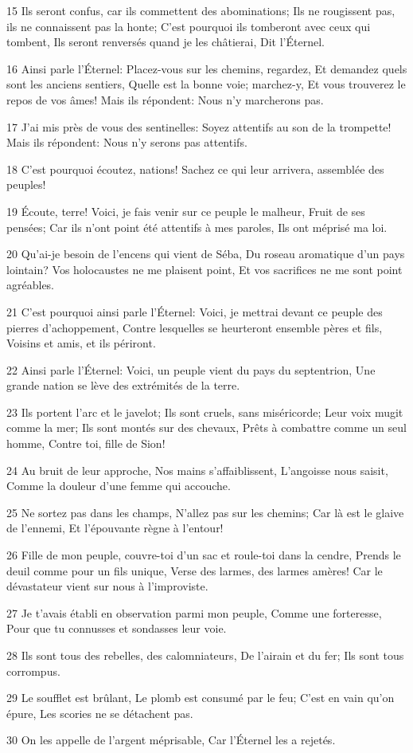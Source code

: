 \par 15 Ils seront confus, car ils commettent des abominations; Ils ne rougissent pas, ils ne connaissent pas la honte; C'est pourquoi ils tomberont avec ceux qui tombent, Ils seront renversés quand je les châtierai, Dit l'Éternel.
\par 16 Ainsi parle l'Éternel: Placez-vous sur les chemins, regardez, Et demandez quels sont les anciens sentiers, Quelle est la bonne voie; marchez-y, Et vous trouverez le repos de vos âmes! Mais ils répondent: Nous n'y marcherons pas.
\par 17 J'ai mis près de vous des sentinelles: Soyez attentifs au son de la trompette! Mais ils répondent: Nous n'y serons pas attentifs.
\par 18 C'est pourquoi écoutez, nations! Sachez ce qui leur arrivera, assemblée des peuples!
\par 19 Écoute, terre! Voici, je fais venir sur ce peuple le malheur, Fruit de ses pensées; Car ils n'ont point été attentifs à mes paroles, Ils ont méprisé ma loi.
\par 20 Qu'ai-je besoin de l'encens qui vient de Séba, Du roseau aromatique d'un pays lointain? Vos holocaustes ne me plaisent point, Et vos sacrifices ne me sont point agréables.
\par 21 C'est pourquoi ainsi parle l'Éternel: Voici, je mettrai devant ce peuple des pierres d'achoppement, Contre lesquelles se heurteront ensemble pères et fils, Voisins et amis, et ils périront.
\par 22 Ainsi parle l'Éternel: Voici, un peuple vient du pays du septentrion, Une grande nation se lève des extrémités de la terre.
\par 23 Ils portent l'arc et le javelot; Ils sont cruels, sans miséricorde; Leur voix mugit comme la mer; Ils sont montés sur des chevaux, Prêts à combattre comme un seul homme, Contre toi, fille de Sion!
\par 24 Au bruit de leur approche, Nos mains s'affaiblissent, L'angoisse nous saisit, Comme la douleur d'une femme qui accouche.
\par 25 Ne sortez pas dans les champs, N'allez pas sur les chemins; Car là est le glaive de l'ennemi, Et l'épouvante règne à l'entour!
\par 26 Fille de mon peuple, couvre-toi d'un sac et roule-toi dans la cendre, Prends le deuil comme pour un fils unique, Verse des larmes, des larmes amères! Car le dévastateur vient sur nous à l'improviste.
\par 27 Je t'avais établi en observation parmi mon peuple, Comme une forteresse, Pour que tu connusses et sondasses leur voie.
\par 28 Ils sont tous des rebelles, des calomniateurs, De l'airain et du fer; Ils sont tous corrompus.
\par 29 Le soufflet est brûlant, Le plomb est consumé par le feu; C'est en vain qu'on épure, Les scories ne se détachent pas.
\par 30 On les appelle de l'argent méprisable, Car l'Éternel les a rejetés.

